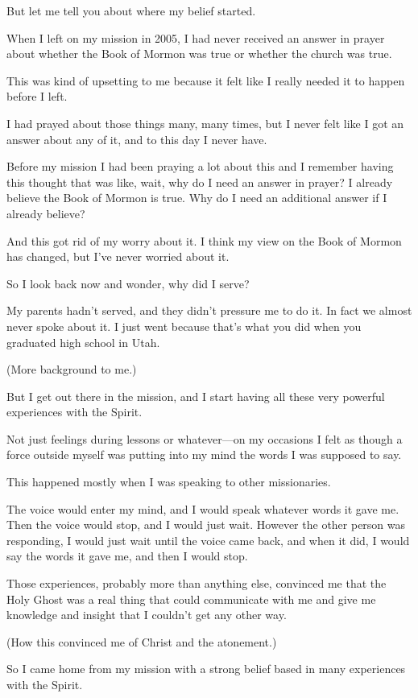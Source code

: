 \begin{compactitem}
			\item But let me tell you about where my belief started.
				\begin{compactitem}
					\item When I left on my mission in 2005, I had never received an answer in prayer about whether the Book of Mormon was true or whether the church was true.
					\item This was kind of upsetting to me because it felt like I really needed it to happen before I left.
					\item I had prayed about those things many, many times, but I never felt like I got an answer about any of it, and to this day I never have.
					\item Before my mission I had been praying a lot about this and I remember having this thought that was like, wait, why do I need an answer in prayer? I already believe the Book of Mormon is true. Why do I need an additional answer if I already believe?
					\item And this got rid of my worry about it. I think my view on the Book of Mormon has changed, but I've never worried about it.
					\item So I look back now and wonder, why did I serve? 
					\item My parents hadn't served, and they didn't pressure me to do it. In fact we almost never spoke about it. I just went because that's what you did when you graduated high school in Utah.
					\item (More background to me.)
					\item But I get out there in the mission, and I start having all these very powerful experiences with the Spirit.
					\item Not just feelings during lessons or whatever---on my occasions I felt as though a force outside myself was putting into my mind the words I was supposed to say.
					\item This happened mostly when I was speaking to other missionaries.
					\item The voice would enter my mind, and I would speak whatever words it gave me. Then the voice would stop, and I would just wait. However the other person was responding, I would just wait until the voice came back, and when it did, I would say the words it gave me, and then I would stop.
					\item Those experiences, probably more than anything else, convinced me that the Holy Ghost was a real thing that could communicate with me and give me knowledge and insight that I couldn't get any other way.
					\item (How this convinced me of Christ and the atonement.)
					\item So I came home from my mission with a strong belief based in many experiences with the Spirit.
				\end{compactitem}
				

\end{compactitem}
